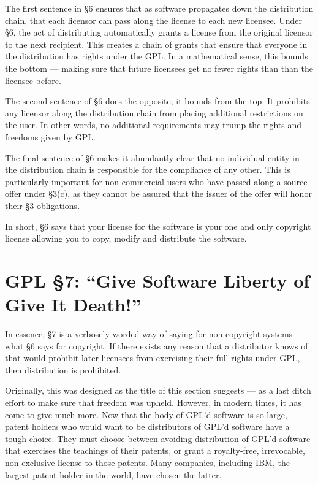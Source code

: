 \documentclass[12pt]{report}
\begin{document}
The first sentence in \S 6 ensures that as software propagates down the
distribution chain, that each licensor can pass along the license to each
new licensee.  Under \S 6, the act of distributing automatically grants a
license from the original licensor to the next recipient.  This creates a
chain of grants that ensure that everyone in the distribution has rights
under the GPL\@.  In a mathematical sense, this bounds the bottom ---
making sure that future licensees get no fewer rights than than the
licensee before.

The second sentence of \S 6 does the opposite; it bounds from the top.  It
prohibits any licensor along the distribution chain from placing
additional restrictions on the user.  In other words, no additional
requirements may trump the rights and freedoms given by GPL\@.

The final sentence of \S 6 makes it abundantly clear that no individual
entity in the distribution chain is responsible for the compliance of any
other.  This is particularly important for non-commercial users who have
passed along a source offer under \S 3(c), as they cannot be assured that
the issuer of the offer will honor their \S 3 obligations.

In short, \S 6 says that your license for the software is your one and
only copyright license allowing you to copy, modify and distribute the
software.

\section{GPL \S 7: ``Give Software Liberty of Give It Death!''}
\label{GPLs7}

In essence, \S 7 is a verbosely worded way of saying for non-copyright
systems what \S 6 says for copyright.  If there exists any reason that a
distributor knows of that would prohibit later licensees from exercising
their full rights under GPL, then distribution is prohibited.

Originally, this was designed as the title of this section suggests --- as
a last ditch effort to make sure that freedom was upheld.  However, in
modern times, it has come to give much more.  Now that the body of GPL'd
software is so large, patent holders who would want to be distributors of
GPL'd software have a tough choice.  They must choose between avoiding
distribution of GPL'd software that exercises the teachings of their
patents, or grant a royalty-free, irrevocable, non-exclusive license to
those patents.  Many companies, including IBM, the largest patent holder
in the world, have chosen the latter.
\end{document}
